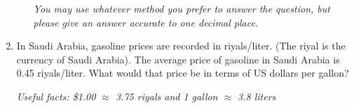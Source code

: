 \documentclass[12pt]{article}
\begin{document}
\begin{enumerate}
\begin{enumerate}
\emph{You may use whatever method you prefer to answer the question, but please give an answer accurate to one decimal place.}
\vfill

\end{enumerate}

\noindent \hrulefill
\item In Saudi Arabia, gasoline prices are recorded in riyals/liter.  (The riyal is the currency of Saudi Arabia).  The average price of gasoline in Saudi Arabia is 0.45 riyals/liter.  What would that price be in terms of US dollars per gallon?

\emph{Useful facts:  \$1.00 $\approx$ 3.75 riyals and 1 gallon $\approx$ 3.8 liters }
\vfill


\end{enumerate}




\newpage
\end{document}
